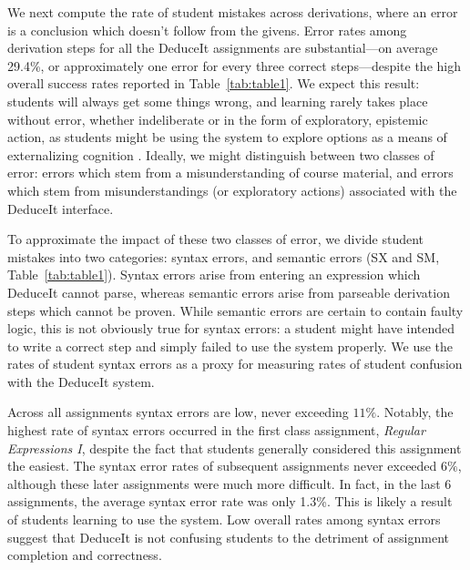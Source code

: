 \documentclass{sigchi}
\newcommand{\msb}[1]{\textbf{\textcolor{cyan}{Michael: #1}}}
\begin{document}
We next compute the rate of student mistakes across derivations, where an error is a conclusion which doesn't follow from the givens. Error rates among derivation steps for all the DeduceIt assignments are substantial---on average 29.4\%, or approximately one error for every three correct steps---despite the high overall success rates reported in Table~\ref{tab:table1}. We expect this result: students will always get some things wrong, and learning rarely takes place without error, whether indeliberate or in the form of exploratory, epistemic action, as students might be using the system to explore options as a means of externalizing cognition \cite{citeulike}. Ideally, we might distinguish between two classes of error: errors which stem from a misunderstanding of course material, and errors which stem from misunderstandings (or exploratory actions) associated with the DeduceIt interface. %

To approximate the impact of these two classes of error, we divide student mistakes into two categories: syntax errors, and semantic errors (SX and SM, Table~\ref{tab:table1}). Syntax errors arise from entering an expression which DeduceIt cannot parse, whereas semantic errors arise from parseable derivation steps which cannot be proven. While semantic errors are certain to contain faulty logic, this is not obviously true for syntax errors: a student might have intended to write a correct step and simply failed to use the system properly. We use the rates of student syntax errors as a proxy for measuring rates of student confusion with the DeduceIt system.

Across all assignments syntax errors are low, never exceeding $11\%$. Notably, the highest rate of syntax errors occurred in the first class assignment, \textit{Regular Expressions I}, despite the fact that students generally considered this assignment the easiest. The syntax error rates of subsequent assignments never exceeded $6\%$, although these later assignments were much more difficult. In fact, in the last 6 assignments, the average syntax error rate was only 1.3\%. This is likely a result of students learning to use the system. Low overall rates among syntax errors suggest that DeduceIt is not confusing students to the detriment of assignment completion and correctness.
\end{document}
